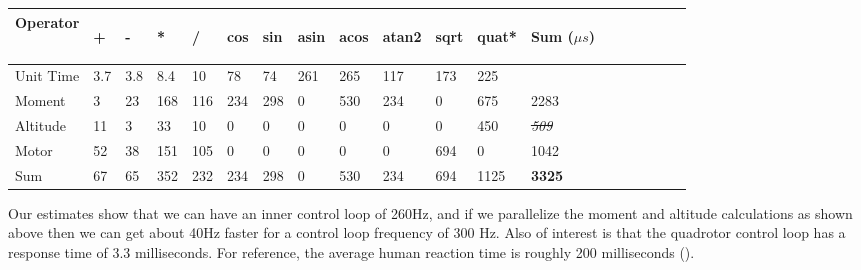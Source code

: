 \documentclass{article}
\numberwithin{equation}{section} %
\begin{document}
\begin{longtable}{l l l l l l l l l l l l l l l l l l l }
\textbf{Operator}&	
\begin{sideways}+\end{sideways}	&	
\begin{sideways}-\end{sideways}	&	
\begin{sideways}*\end{sideways}	&	
\begin{sideways}/\end{sideways}	&	
\begin{sideways}cos\end{sideways}	&	
\begin{sideways}sin\end{sideways}	&	
\begin{sideways}asin\end{sideways}	&	
\begin{sideways}acos\end{sideways}	&	
\begin{sideways}atan2\end{sideways}	&	
\begin{sideways}sqrt\end{sideways}	&	
\begin{sideways}quat*\end{sideways}	&	
\begin{sideways}Sum ($\mu s$)\end{sideways} \\
	\hline
Unit Time&	3.7	&	3.8	&	8.4	&	10	&	78	&	74	&	261	&	265	&	117	&	173	&	225	&\\
	\hline
Moment	&	3	&	23	&	168	&	116&	234	&	298	&	0	&	530	&	234	&	0	&	675	&	2283 \\
	\hline
Altitude	&	11	&	3	&	33	&	10	&	0	&	0	&	0	&	0	&	0	&	0	&	450	&	 \sout{\textit{509}} \\
	\hline
Motor	&	52	&	38	&	151	&	105	&	0	&	0	&	0	&	0	&	0	&	694	&	0	&	1042\\
	\hline
Sum	&	67	&	65	&	352	&	232	&	234	&	298	&	0	&	530	&	234	&	694	&	1125	&	\textbf{3325}\\	
\end{longtable}


Our estimates show that we can have an inner control loop of 260Hz, and if we parallelize the moment and altitude calculations as shown above then we can get about 40Hz faster for a control loop frequency of 300 Hz. Also of interest is that the quadrotor control loop has a response time of 3.3 milliseconds. For reference, the average human reaction time is roughly 200 milliseconds (\cite{human_reaction_time}).
\end{document}
